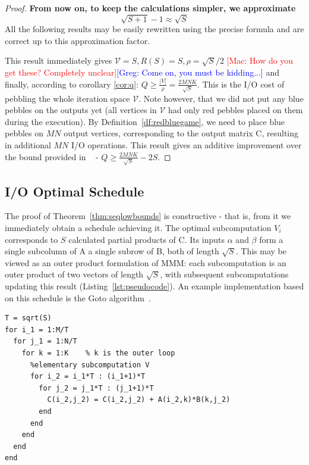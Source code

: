 \documentclass[sigplan,review,anonymous]{acmart}\settopmatter{printfolios=true,printccs=false,printacmref=false}
\newcommand\greg[1]{\textcolor{blue}{[Greg: #1]}}
\newcommand\mac[1]{\textcolor{red}{[Mac: #1]}}
\begin{document}
\begin{proof}
 
  \textbf{From now on, to keep the calculations simpler, we approximate} 
 \begin{equation}
 \label{eq:approx}
 \sqrt{S + 1} - 1 \approx \sqrt{S}
 \end{equation}
 All the following results may be easily rewritten using the precise formula and
 are correct up to this approximation factor.
 
 This result immediately gives $\mathcal{V} = S, R(S) = S, \rho = \sqrt{S}/2$
 \mac{How do you get these? Completely unclear}\greg{Come on, you must be 
 kidding...} and finally, according to
 corollary \ref{cor:q}:  $Q \ge \frac{|V|}{\rho} = \frac{2MNK}{\sqrt{S}}$.
 This is the I/O cost of pebbling the whole iteration space $\mathcal{V}$. Note 
 however, that we did not put any blue pebbles on the outputs yet (all vertices 
 in $\mathcal{V}$ had only red pebbles placed on them during the execution). By 
 Definition~\ref{df:redbluegame}, we need to place blue pebbles on $MN$ output 
 vertices, corresponding to the output matrix C, resulting in additional $MN$ 
 I/O operations.
 This result gives an additive improvement over the bound provided in
~\cite{tightMMM} - $Q \ge \frac{2MNK}{\sqrt{S}} - 2S$.
\end{proof}
 
 \subsection{I/O Optimal Schedule}
 The proof of Theorem~\ref{thm:seqlowbounds} is constructive - that is, from it 
 we immediately obtain a schedule achieving it. The optimal subcomputation 
 $V_i$ 
 corresponds to $S$ calculated partial products of C. Its inputs $\alpha$ and 
 $\beta$ form a single subcolumn of A a single subrow of B, both of length 
 $\sqrt{S}$. This may be viewed as an outer product formulation of MMM: each 
 subcomputation is an outer product of two vectors of length $\sqrt{S}$, with 
 subsequent subcomputations updating this result 
 (Listing~\ref{lst:pseudocode}). An example implementation 
 based on this schedule is the Goto algorithm~\cite{Goto}.
 
 \begin{lstlisting}[caption={Pseudocode of I/O optimal sequential MMM}, 
 label={lst:pseudocode}, 
 basicstyle=\tiny]
T = sqrt(S)
for i_1 = 1:M/T
  for j_1 = 1:N/T
    for k = 1:K    % k is the outer loop
      %elementary subcomputation V
      for i_2 = i_1*T : (i_1+1)*T
        for j_2 = j_1*T : (j_1+1)*T
          C(i_2,j_2) = C(i_2,j_2) + A(i_2,k)*B(k,j_2)
        end
      end
    end
  end
end
 \end{lstlisting}
 
\end{document}
